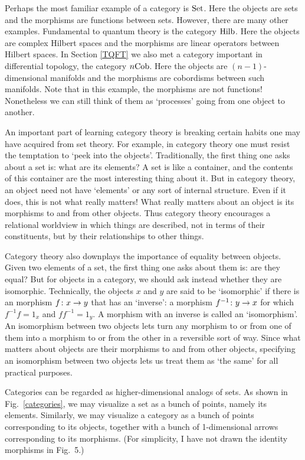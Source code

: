 \documentclass[12pt,amsfonts]{article}
\begin{document}
Perhaps the most familiar example of a category is ${\rm Set}$.  Here the
objects are sets and the morphisms are functions between sets.  
However, there are many other examples.  Fundamental to quantum theory
is the category ${\rm Hilb}$.  Here the objects are complex Hilbert spaces
and the morphisms are linear operators between Hilbert spaces.  In
Section \ref{TQFT} we also met a category important in differential
topology, the category $n{\rm Cob}$.  Here the objects are
$(n-1)$-dimensional manifolds and the morphisms are cobordisms between
such manifolds.  Note that in this example, the morphisms are not
functions!  Nonetheless we can still think of them as `processes' going
from one object to another.  

An important part of learning category theory is breaking certain habits
one may have acquired from set theory.  For example, in category theory
one must resist the temptation to `peek into the objects'.   Traditionally, 
the first thing one asks about a set is: what are its elements?  A set
is like a container, and the contents of this container are the most
interesting thing about it.   But in category theory, an object need not
have `elements' or any sort of internal structure.  Even if it does,
this is not what really matters!   What really matters about an object
is its morphisms to and from other objects.   Thus category theory
encourages a relational worldview in which things are described, not in
terms of their constituents, but by their relationships to other things.
 
Category theory also downplays the importance of equality between
objects.  Given two elements of a set, the first thing one asks about
them is: are they equal?  But for objects in a category, we should ask
instead whether they are isomorphic.  Technically, the objects $x$ and
$y$ are said to be `isomorphic' if there is an morphism $f \colon x \rightarrow
y$ that has an `inverse': a morphism $f^{-1} \colon y \rightarrow x$ for which
$f^{-1}f = 1_x$ and $ff^{-1} = 1_y$.  A morphism with an inverse is
called an `isomorphism'.  An isomorphism between two objects lets turn
any morphism to or from one of them into a morphism to or from the other
in a reversible sort of way.  Since what matters about objects are their
morphisms to and from other objects, specifying an isomorphism between
two objects lets us treat them as `the same' for all practical purposes.

Categories can be regarded as higher-dimensional analogs of sets.  As
shown in Fig.\ \ref{categories}, we may visualize a set as a bunch of
points, namely its elements.  Similarly, we may visualize a category as
a bunch of points corresponding to its objects, together with a bunch of
1-dimensional arrows corresponding to its morphisms.  (For simplicity, I
have not drawn the identity morphisms in Fig.\ 5.)
\end{document}
